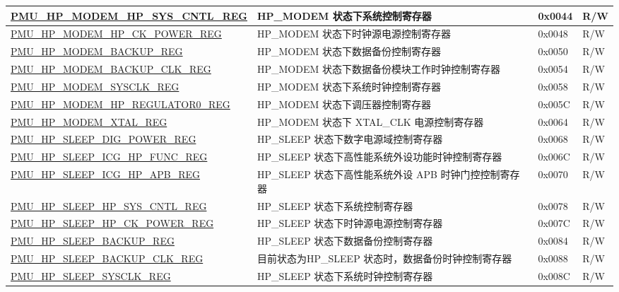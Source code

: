 \begin{longtable}{ | l | p{6cm} | l | l | }
\hyperref[regdesc:PMUHPMODEMHPSYSCNTLREG]{PMU\_HP\_MODEM\_HP\_SYS\_CNTL\_REG} & HP\_MODEM 状态下系统控制寄存器 & 0x0044 & R/W \\ \hline
\hyperref[regdesc:PMUHPMODEMHPCKPOWERREG]{PMU\_HP\_MODEM\_HP\_CK\_POWER\_REG} & HP\_MODEM 状态下时钟源电源控制寄存器 & 0x0048 & R/W \\ \hline
\hyperref[regdesc:PMUHPMODEMBACKUPREG]{PMU\_HP\_MODEM\_BACKUP\_REG} & HP\_MODEM 状态下数据备份控制寄存器 & 0x0050 & R/W \\ \hline
\hyperref[regdesc:PMUHPMODEMBACKUPCLKREG]{PMU\_HP\_MODEM\_BACKUP\_CLK\_REG} & HP\_MODEM 状态下数据备份模块工作时钟控制寄存器 & 0x0054 & R/W \\ \hline
\hyperref[regdesc:PMUHPMODEMSYSCLKREG]{PMU\_HP\_MODEM\_SYSCLK\_REG} & HP\_MODEM 状态下系统时钟控制寄存器  & 0x0058 & R/W \\ \hline
\hyperref[regdesc:PMUHPMODEMHPREGULATOR0REG]{PMU\_HP\_MODEM\_HP\_REGULATOR0\_REG} & HP\_MODEM 状态下调压器控制寄存器 & 0x005C & R/W \\ \hline
\hyperref[regdesc:PMUHPMODEMXTALREG]{PMU\_HP\_MODEM\_XTAL\_REG} & HP\_MODEM 状态下 XTAL\_CLK 电源控制寄存器 & 0x0064 & R/W \\ \hline
\hyperref[regdesc:PMUHPSLEEPDIGPOWERREG]{PMU\_HP\_SLEEP\_DIG\_POWER\_REG} & HP\_SLEEP 状态下数字电源域控制寄存器 & 0x0068 & R/W \\ \hline
\hyperref[regdesc:PMUHPSLEEPICGHPFUNCREG]{PMU\_HP\_SLEEP\_ICG\_HP\_FUNC\_REG} & HP\_SLEEP 状态下高性能系统外设功能时钟控制寄存器 & 0x006C & R/W \\ \hline
\hyperref[regdesc:PMUHPSLEEPICGHPAPBREG]{PMU\_HP\_SLEEP\_ICG\_HP\_APB\_REG} & HP\_SLEEP 状态下高性能系统外设 APB 时钟门控控制寄存器& 0x0070 & R/W \\ \hline
\hyperref[regdesc:PMUHPSLEEPHPSYSCNTLREG]{PMU\_HP\_SLEEP\_HP\_SYS\_CNTL\_REG} & HP\_SLEEP 状态下系统控制寄存器 & 0x0078 & R/W \\ \hline
\hyperref[regdesc:PMUHPSLEEPHPCKPOWERREG]{PMU\_HP\_SLEEP\_HP\_CK\_POWER\_REG} & HP\_SLEEP 状态下时钟源电源控制寄存器 & 0x007C & R/W \\ \hline
\hyperref[regdesc:PMUHPSLEEPBACKUPREG]{PMU\_HP\_SLEEP\_BACKUP\_REG} & HP\_SLEEP 状态下数据备份控制寄存器 & 0x0084 & R/W \\ \hline
\hyperref[regdesc:PMUHPSLEEPBACKUPCLKREG]{PMU\_HP\_SLEEP\_BACKUP\_CLK\_REG} & 目前状态为HP\_SLEEP 状态时，数据备份时钟控制寄存器 & 0x0088 & R/W \\ \hline
\hyperref[regdesc:PMUHPSLEEPSYSCLKREG]{PMU\_HP\_SLEEP\_SYSCLK\_REG} & HP\_SLEEP 状态下系统时钟控制寄存器  & 0x008C & R/W \\ \hline

\end{longtable}
